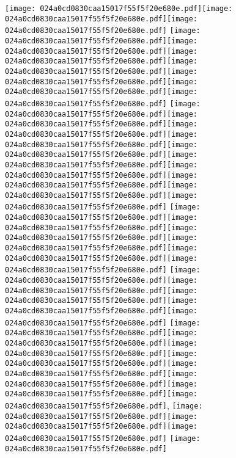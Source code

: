 \documentclass{article}
\newcommand{\origpg}[2]{\texttt{[image: 024a0cd0830caa15017f55f5f20e680e.pdf]}}
\begin{document}
{\vspace{11.005pt} \hspace{31.403pt}\origpg{12}{120.74pt 365.3pt 132.39pt 381.45pt}\origpg{12}{132.3pt 365.3pt 140.37pt 381.45pt}\origpg{12}{140.46pt 365.3pt 149.1pt 381.45pt} \origpg{12}{159.96pt 365.3pt 167.13pt 381.45pt}\origpg{12}{167.18pt 365.3pt 175.81pt 381.45pt}\hspace{-0.21pt}\origpg{12}{175.6pt 365.3pt 182.77pt 381.45pt}\hspace{0.291pt}\origpg{12}{183.06pt 365.3pt 191.11pt 381.45pt}\origpg{12}{191.02pt 365.3pt 199.65pt 381.45pt}\origpg{12}{199.65pt 365.3pt 206.03pt 381.45pt}\origpg{12}{205.95pt 365.3pt 213.11pt 381.45pt} \origpg{12}{224.01pt 365.3pt 232.64pt 381.45pt}\origpg{12}{232.64pt 365.3pt 240.71pt 381.45pt}\hspace{-0.323pt}\origpg{12}{240.39pt 365.3pt 248.44pt 381.45pt}\origpg{12}{248.35pt 365.3pt 256.42pt 381.45pt}\hspace{-0.355pt}\origpg{12}{256.06pt 365.3pt 264.18pt 381.45pt}\origpg{12}{264.23pt 365.3pt 271.39pt 381.45pt}\hspace{-0.178pt}\origpg{12}{271.22pt 365.3pt 279.85pt 381.45pt}\origpg{12}{279.85pt 365.3pt 288.49pt 381.45pt}\origpg{12}{288.55pt 365.3pt 299.4pt 381.45pt}\origpg{12}{299.4pt 365.3pt 307.47pt 381.45pt} \origpg{12}{318.41pt 365.3pt 326.63pt 381.45pt}\origpg{12}{326.63pt 365.3pt 333.79pt 381.45pt}\origpg{12}{333.79pt 365.3pt 342.43pt 381.45pt}\origpg{12}{342.49pt 365.3pt 351.13pt 381.45pt}\origpg{12}{351.13pt 365.3pt 361.97pt 381.45pt}\hspace{-0.21pt}\origpg{12}{361.76pt 365.3pt 369.83pt 381.45pt} \origpg{12}{380.79pt 365.3pt 391.01pt 381.45pt}\origpg{12}{390.91pt 365.3pt 398.98pt 381.45pt}\hspace{-0.597pt}\origpg{12}{398.39pt 365.3pt 409.54pt 381.45pt}\origpg{12}{409.47pt 365.3pt 418.11pt 381.45pt}\origpg{12}{418.11pt 365.3pt 426.18pt 381.45pt} \origpg{12}{437.17pt 365.3pt 443.55pt 381.45pt}\hspace{-0.113pt}\origpg{12}{443.43pt 365.3pt 450.6pt 381.45pt}\origpg{12}{450.65pt 365.3pt 460.87pt 381.45pt}\origpg{12}{460.77pt 365.3pt 467.94pt 381.45pt}\hspace{-0.178pt}\origpg{12}{467.76pt 365.3pt 474.81pt 381.45pt}\origpg{12}{474.75pt 365.3pt 483.38pt 381.45pt}\origpg{12}{483.38pt 365.3pt 490.43pt 381.45pt}\origpg{12}{490.43pt 365.3pt 497.79pt 381.45pt}, \origpg{12}{513.01pt 365.3pt 521.13pt 381.45pt}\origpg{12}{521.18pt 365.3pt 528.24pt 381.45pt}\hspace{-0.307pt}\origpg{12}{527.93pt 365.3pt 536pt 381.45pt} \origpg{12}{546.96pt 365.3pt 554.58pt 381.45pt} 

}
\end{document}
